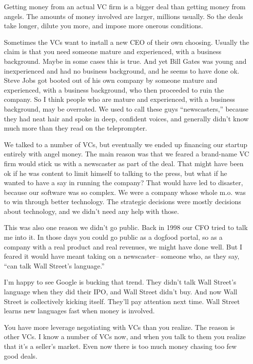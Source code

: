 \documentclass[12pt]{book}
\begin{document}
Getting money from an actual VC firm is a bigger deal than getting money
from angels. The amounts of money involved are larger, millions usually.
So the deals take longer, dilute you more, and impose more onerous
conditions.

Sometimes the VCs want to install a new CEO of their own choosing.
Usually the claim is that you need someone mature and experienced, with
a business background. Maybe in some cases this is true. And yet Bill
Gates was young and inexperienced and had no business background, and he
seems to have done ok. Steve Jobs got booted out of his own company by
someone mature and experienced, with a business background, who then
proceeded to ruin the company. So I think people who are mature and
experienced, with a business background, may be overrated. We used to
call these guys ``newscasters,'' because they had neat hair and spoke in
deep, confident voices, and generally didn't know much more than they
read on the teleprompter.

We talked to a number of VCs, but eventually we ended up financing our
startup entirely with angel money. The main reason was that we feared a
brand-name VC firm would stick us with a newscaster as part of the deal.
That might have been ok if he was content to limit himself to talking to
the press, but what if he wanted to have a say in running the company?
That would have led to disaster, because our software was so complex. We
were a company whose whole m.o. was to win through better technology.
The strategic decisions were mostly decisions about technology, and we
didn't need any help with those.

This was also one reason we didn't go public. Back in 1998 our CFO tried
to talk me into it. In those days you could go public as a dogfood
portal, so as a company with a real product and real revenues, we might
have done well. But I feared it would have meant taking on a
newscaster-- someone who, as they say, ``can talk Wall Street's
language.''

I'm happy to see Google is bucking that trend. They didn't talk Wall
Street's language when they did their IPO, and Wall Street didn't buy.
And now Wall Street is collectively kicking itself. They'll pay
attention next time. Wall Street learns new languages fast when money is
involved.

You have more leverage negotiating with VCs than you realize. The reason
is other VCs. I know a number of VCs now, and when you talk to them you
realize that it's a seller's market. Even now there is too much money
chasing too few good deals.
\end{document}
